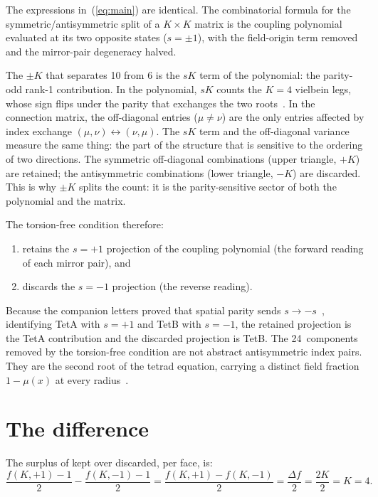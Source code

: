 \documentclass[11pt]{article}
\begin{document}
The expressions in~(\ref{eq:main}) are identical.  The
combinatorial formula for the symmetric/antisymmetric split
of a $K \times K$ matrix is the coupling polynomial evaluated
at its two opposite states ($s = \pm 1$), with the
field-origin term removed and the mirror-pair degeneracy
halved.

The $\pm K$ that separates 10 from 6 is the $sK$ term of the
polynomial: the parity-odd rank-1 contribution.  In the
polynomial, $sK$ counts the $K = 4$ vielbein legs, whose sign
flips under the parity that exchanges the two
roots~\cite{Nelson2026b}.  In the connection matrix, the
off-diagonal entries ($\mu \neq \nu$) are the only entries
affected by index exchange $(\mu, \nu) \leftrightarrow
(\nu, \mu)$.  The $sK$ term and the off-diagonal variance
measure the same thing: the part of the structure that is
sensitive to the ordering of two directions.  The symmetric
off-diagonal combinations (upper triangle, $+K$) are retained;
the antisymmetric combinations (lower triangle, $-K$) are
discarded.  This is why $\pm K$ splits the count: it is the
parity-sensitive sector of both the polynomial and the matrix.

The torsion-free condition therefore:
\begin{enumerate}
  \item retains the $s = +1$ projection of the coupling
    polynomial (the forward reading of each mirror pair), and
  \item discards the $s = -1$ projection (the reverse reading).
\end{enumerate}

Because the companion letters proved that spatial parity sends
$s \to -s$~\cite{Nelson2026a,Nelson2026b}, identifying TetA with $s = +1$ and TetB with
$s = -1$, the retained projection is the TetA contribution
and the discarded projection is TetB.  The 24~components
removed by the torsion-free condition are not abstract
antisymmetric index pairs.  They are the second root of the
tetrad equation, carrying a distinct field fraction
$1 - \mu(x)$ at every radius~\cite{Nelson2026b}.

\section{The difference}

The surplus of kept over discarded, per face, is:
\begin{equation}
  \frac{f(K,{+}1) - 1}{2} - \frac{f(K,{-}1) - 1}{2}
  = \frac{f(K,{+}1) - f(K,{-}1)}{2}
  = \frac{\Delta f}{2}
  = \frac{2K}{2}
  = K = 4.
  \label{eq:diff_per_face}
\end{equation}
\end{document}
